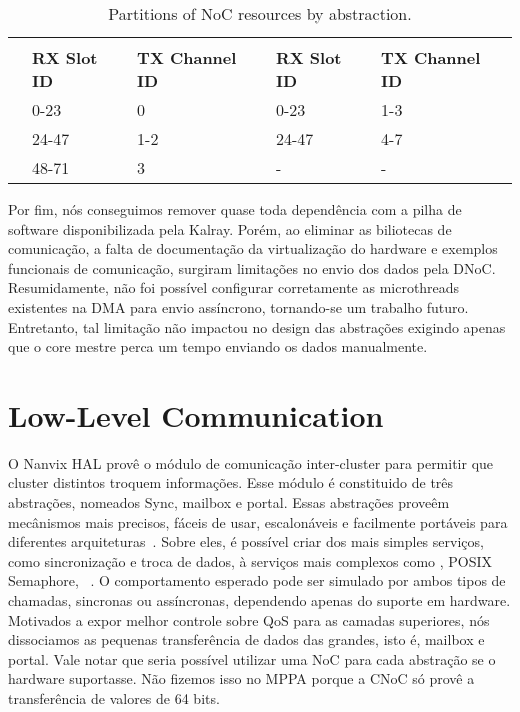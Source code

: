 		\begin{table}[!tb]
			\centering%
			\caption{Partitions of NoC resources by abstraction.}%
			\label{tab.noc-resources}%

			\begin{tabular}{l|l|l|l|l|}
				\cline{2-5}
														& \multicolumn{2}{c|}{\textbf{\cnoc}}          & \multicolumn{2}{c|}{\textbf{\dnoc}}          \\ \cline{2-5}
														& \textbf{RX Slot ID} & \textbf{TX Channel ID} & \textbf{RX Slot ID} & \textbf{TX Channel ID} \\ \hline
				\multicolumn{1}{|l|}{\textbf{\mailbox}} & 0-23                & 0                      & 0-23                & 1-3                    \\ \hline
				\multicolumn{1}{|l|}{\textbf{\portal}}  & 24-47               & 1-2                    & 24-47               & 4-7                    \\ \hline
				\multicolumn{1}{|l|}{\textbf{\sync}}    & 48-71               & 3                      & -                   & -                      \\ \hline
			\end{tabular}

		\end{table}

		Por fim, nós conseguimos remover quase toda dependência com a pilha de software disponibilizada pela Kalray.
		Porém, ao eliminar as biliotecas de comunicação, a falta de documentação da virtualização do hardware e exemplos funcionais de comunicação, surgiram limitações no envio dos dados pela DNoC.
		Resumidamente, não foi possível configurar corretamente as microthreads existentes na DMA para envio assíncrono, tornando-se um trabalho futuro.
		Entretanto, tal limitação não impactou no design das abstrações exigindo apenas que o core mestre perca um tempo enviando os dados manualmente.

	\section{Low-Level Communication}
	\label{sec.low-level-comm}

		O Nanvix HAL provê o módulo de comunicação inter-cluster para permitir que cluster distintos troquem informações.
		Esse módulo é constituido de três abstrações, nomeados Sync, mailbox e portal.
		Essas abstrações proveêm mecânismos mais precisos, fáceis de usar, escalonáveis e facilmente portáveis para diferentes arquiteturas~\cite{wentzlaff_fleets:_2011}.
		Sobre eles, é possível criar dos mais simples serviços, como sincronização e troca de dados, à serviços mais complexos como \shm, POSIX Semaphore, \rmem~\cite{penna:rmen}.
		O comportamento esperado pode ser simulado por ambos tipos de chamadas, sincronas ou assíncronas, dependendo apenas do suporte em hardware.
		Motivados a expor melhor controle sobre QoS para as camadas superiores, nós dissociamos as pequenas transferência de dados das grandes, isto é, mailbox e portal.
		Vale notar que seria possível utilizar uma NoC para cada abstração se o hardware suportasse.
		Não fizemos isso no MPPA porque a CNoC só provê a transferência de valores de 64 bits.

